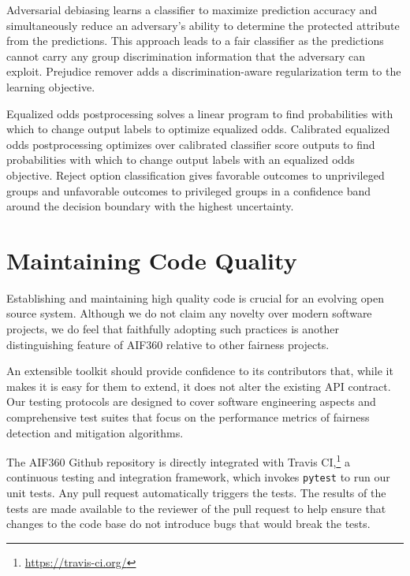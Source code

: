 \documentclass{article}
\begin{document}
 Adversarial debiasing \citep{ZhangLM2018} learns a classifier to maximize prediction accuracy and simultaneously reduce an adversary’s ability to determine the protected attribute from the predictions. This approach leads to a fair classifier as the predictions cannot carry any group discrimination information that the adversary can exploit. Prejudice remover \citep{kamishima2012fairness} adds a discrimination-aware regularization term to the learning objective.

 Equalized odds postprocessing \citep{hardt2016equality} solves a linear program to find probabilities with which to change output labels to optimize equalized odds. Calibrated equalized odds postprocessing \citep{pleiss2017fairness} optimizes over calibrated classifier score outputs to find probabilities with which to change output labels with an equalized odds objective. Reject option classification \citep{Kamiran2012} gives favorable outcomes to unprivileged groups and unfavorable outcomes to privileged groups in a confidence band around the decision boundary with the highest uncertainty.

\section{Maintaining Code Quality}
\label{sec:testing}

Establishing and maintaining high quality code is crucial for an evolving open source system. Although we do not claim any novelty over modern software projects, we do feel that faithfully adopting such practices is another distinguishing feature of AIF360 relative to other fairness projects.

An extensible toolkit should provide  confidence to its contributors that, while it makes it is easy for them to extend, it does not alter the existing API contract. Our testing protocols are designed to cover software engineering aspects and comprehensive test suites that focus on the performance metrics of fairness detection and mitigation algorithms. 

The AIF360 Github repository is directly integrated with Travis CI,\footnote{\url{https://travis-ci.org/}} a continuous testing and integration framework, which invokes {\tt pytest} to run our unit tests. Any pull request automatically triggers the tests.  The results of the tests are made available to the reviewer of the pull request to help ensure that changes to the code base do not introduce bugs that would break the tests.
\end{document}
